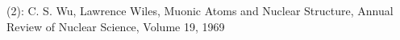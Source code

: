 \documentclass[preview]{standalone}
\begin{document}
\begin{center}
(2): C. S. Wu, Lawrence Wiles, Muonic Atoms and Nuclear Structure, Annual Review of Nuclear Science, Volume 19, 1969
\end{center}
\end{document}
